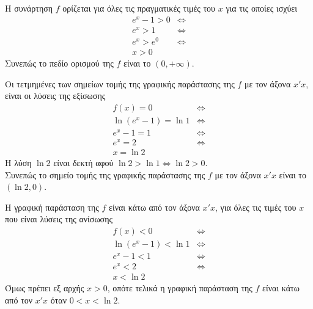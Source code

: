 \begin{alist}
\item Η συνάρτηση $f$ ορίζεται για όλες τις πραγματικές τιμές του $x$ για τις οποίες ισχύει
\begin{align*}
e^x - 1 > 0 &\Leftrightarrow \\
e^x > 1 &\Leftrightarrow \\
e^x > e^0 &\Leftrightarrow \\
x > 0
\end{align*}
Συνεπώς το πεδίο ορισμού της $f$ είναι το $(0, +\infty)$.
\item Οι τετμημένες των σημείων τομής της γραφικής παράστασης της $f$ με τον άξονα $x'x$, είναι οι λύσεις της εξίσωσης
\begin{align*}
f(x) = 0 &\Leftrightarrow \\
\ln(e^x - 1) = \ln 1 &\Leftrightarrow \\
e^x - 1 = 1 &\Leftrightarrow \\
e^x = 2 &\Leftrightarrow \\
x = \ln 2
\end{align*}
Η λύση $\ln 2$ είναι δεκτή αφού $\ln 2 > \ln 1 \Leftrightarrow \ln 2 > 0$. \\
Συνεπώς το σημείο τομής της γραφικής παράστασης της $f$ με τον άξονα $x'x$ είναι το $(\ln 2, 0)$.
\item Η γραφική παράσταση της $f$ είναι κάτω από τον άξονα $x'x$, για όλες τις τιμές του $x$ που είναι λύσεις της ανίσωσης
\begin{align*}
f(x) < 0 &\Leftrightarrow \\
\ln(e^x - 1) < \ln 1 &\Leftrightarrow \\
e^x - 1 < 1 &\Leftrightarrow \\
e^x < 2 &\Leftrightarrow \\
x < \ln 2
\end{align*}
Όμως πρέπει εξ αρχής $x > 0$, οπότε τελικά η γραφική παράσταση της $f$ είναι κάτω από τον $x'x$ όταν $0 < x < \ln 2$.
\end{alist}

